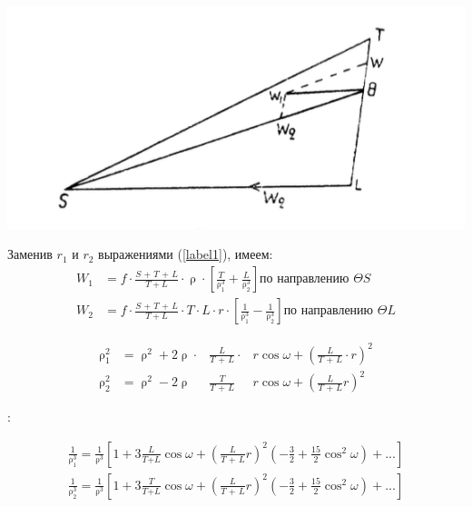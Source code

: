 \documentclass[a4paper,12pt]{article}
\begin{document}
\begin{center}
    \includegraphics{23.png}
    \label{fig3}
\end{center}

Заменив $r_1$ и $r_2$ выражениями (\ref{label1}), имеем:
\begin{equation*}
    \begin{aligned}
        \textit{W}_1 & = f \cdot \frac{\textit{S + T + L}}{T + L} \cdot \uprho \cdot \left[\frac{\textit{T}}{\uprho_1^3} + \frac{\textit{L}}{\uprho_2^3}\right] \text{по направлению } \Theta{\textit{S}}                      \\
        \textit{W}_2 & = f \cdot \frac{\textit{S + T + L}}{T + L} \cdot \textit{T} \cdot \textit{L} \cdot \textit{r} \cdot \left[\frac{1}{\uprho_1^3} - \frac{1}{\uprho_2^3}\right]  \text{по направлению } \Theta{\textit{L}}
    \end{aligned}
\end{equation*}


\begin{equation*}
    \begin{aligned}
        \uprho_1^2 & = \uprho^2 + 2\uprho\cdot & \frac{\textit{L}}{\textit{T + L}}\cdot & \textit{r}\cos\omega + \left( \frac{\textit{L}}{\textit{T + L}} \cdot \textit{r} \right)^2 \\
        \uprho_2^2 & = \uprho^2 - 2\uprho      & \frac{\textit{T}}{\textit{T + L}}      & \textit{r}\cos\omega + \left( \frac{\textit{L}}{\textit{T + L}} \textit{r} \right)^2
    \end{aligned}
\end{equation*}

:

\begin{equation*}
    \begin{aligned}
        \frac{1}{\uprho_1^3} = \frac{1}{\uprho^3}\left[ 1 + 3\frac{\textit{L}}{\textit{T+L}}\cos\omega + \left(\frac{\textit{L}}{\textit{T + L}}\textit{r}\right)^2\left(-\frac{3}{2} + \frac{15}{2}\cos^2\omega\right)+ ...\right] \\
        \frac{1}{\uprho_2^3} = \frac{1}{\uprho^3}\left[ 1 + 3\frac{\textit{T}}{\textit{T+L}}\cos\omega + \left(\frac{\textit{L}}{\textit{T + L}}\textit{r}\right)^2\left(-\frac{3}{2} + \frac{15}{2}\cos^2\omega\right)+ ...\right]
    \end{aligned}
\end{equation*}
\end{document}
